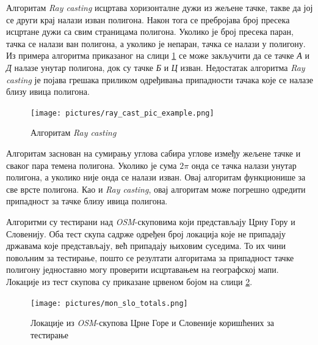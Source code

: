 \documentclass[12pt,oneside]{memoir}
\begin{document}
Алгоритам \textit{Ray casting} исцртава хоризонталне дужи из жељене тачке, такве да јој се други крај налази изван полигона. Након тога се пребројава број пресека исцртане дужи са свим страницама полигона. Уколико је број пресека паран, тачка се налази ван полигона, а уколико је непаран, тачка се налази у полигону. Из примера алгоритма приказаног на слици \ref{fig:ray_cast_algo_example} се може закључити да се тачке \textit{А} и \textit{Д} налазе унутар полигона, док су тачке \textit{Б} и \textit{Ц} изван. Недостатак алгоритма \textit{Ray casting} је појава грешака приликом одређивања припадности тачака које се налазе близу ивица полигона. %

\begin{figure}[!ht]
  \centering
  \texttt{[image: pictures/ray\_cast\_pic\_example.png]}
  \caption{Алгоритам \textit{Ray casting}}
  \label{fig:ray_cast_algo_example}
\end{figure}

Алгоритам заснован на сумирању углова сабира углове између жељене тачке и сваког пара темена полигона. Уколико је сума $2\pi$ онда се тачка налази унутар полигона, а уколико није онда се налази изван. Овај алгоритам функционише за све врсте полигона. Као и  \textit{Ray casting}, овај алгоритам може погрешно одредити припадност за тачке близу ивица полигона.

Алгоритми су тестирани над \textit{OSM}-скуповима који представљају Црну Гору и Словенију. Оба тест скупа садрже одређен број локација које не припадају државама које представљају, већ припадају њиховим суседима. То их чини повољним за тестирање, пошто се резултати алгоритама за припадност тачке полигону једноставно могу проверити исцртавањем на географској мапи. Локације из тест скупова су приказане црвеном бојом на слици \ref{fig:all_map_slo_mon_example}.

\begin{figure}[!ht]
  \centering
  \texttt{[image: pictures/mon\_slo\_totals.png]}
  \caption{Локације из \textit{OSM}-скупова Црне Горе и Словеније коришћених за тестирање}
  \label{fig:all_map_slo_mon_example}
\end{figure}

\end{document}
